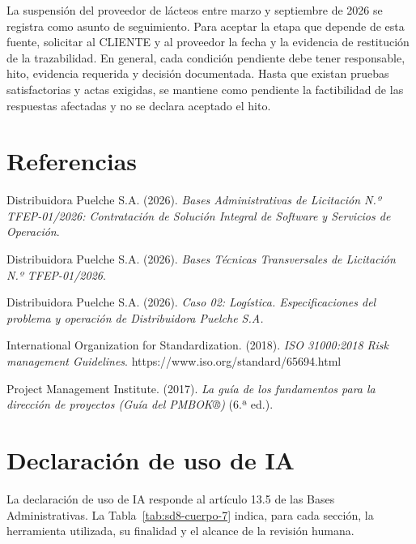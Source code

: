 La suspensión del proveedor de lácteos entre marzo y septiembre de 2026 se registra como asunto de seguimiento. Para aceptar la etapa que depende de esta fuente, solicitar al CLIENTE y al proveedor la fecha y la evidencia de restitución de la trazabilidad. En general, cada condición pendiente debe tener responsable, hito, evidencia requerida y decisión documentada. Hasta que existan pruebas satisfactorias y actas exigidas, se mantiene como pendiente la factibilidad de las respuestas afectadas y no se declara aceptado el hito.

\newpage

\section*{Referencias}

\begingroup
\small\setlength{\parindent}{-0.5in}\setlength{\leftskip}{0.5in}\setlength{\parskip}{3pt}
Distribuidora Puelche S.A. (2026). \emph{Bases Administrativas de Licitación N.º TFEP-01/2026: Contratación de Solución Integral de Software y Servicios de Operación}.

Distribuidora Puelche S.A. (2026). \emph{Bases Técnicas Transversales de Licitación N.º TFEP-01/2026}.

Distribuidora Puelche S.A. (2026). \emph{Caso 02: Logística. Especificaciones del problema y operación de Distribuidora Puelche S.A.}

International Organization for Standardization. (2018). \emph{ISO 31000:2018 Risk management \textemdash{} Guidelines}. https://www.iso.org/standard/65694.html








Project Management Institute. (2017). \emph{La guía de los fundamentos para la dirección de proyectos (Guía del PMBOK®)} (6.ª ed.).
\endgroup

\section*{Declaración de uso de IA}

La declaración de uso de IA responde al artículo 13.5 de las Bases Administrativas. La Tabla~\ref{tab:sd8-cuerpo-7} indica, para cada sección, la herramienta utilizada, su finalidad y el alcance de la revisión humana.

